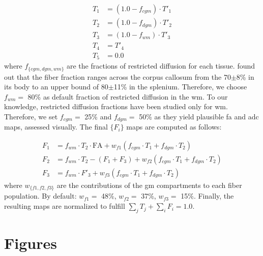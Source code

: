 \documentclass[english]{frontiers/frontiersSCNS} %
\begin{document}
  \begin{align*}
  T_1 &= (1.0-f_{cgm}) \cdot T'_1 \\
  T_2 &= (1.0-f_{dgm}) \cdot T'_2 \\
  T_3 &= (1.0-f_{wm}) \cdot T'_3 \\
  T_4 &= T'_4 \\
  T_5 &= 0.0
  \end{align*}
where $f_{\{cgm, dgm, wm\}}$ are the fractions of restricted diffusion for each tissue.
\cite{sepehrband_brain_2015} found out that the fiber fraction ranges across the corpus
  callosum from the 70$\pm$8\% in its body to an upper bound of 80$\pm$11\% in the splenium.
Therefore, we choose $f_{wm} =$ 80\% as default fraction of restricted diffusion in the
  \gls*{wm}.
To our knowledge, restricted diffusion fractions have been studied only for \gls*{wm}.
Therefore, we set $f_{cgm} =$ 25\% and $f_{dgm} =$ 50\% as they yield plausible \gls*{fa}
  and \gls*{adc} maps, assessed visually.
The final $\{F_i\}$ maps are computed as follows:

\begin{align*}
F_1 &= f_{wm} \cdot T_2 \cdot \text{FA} + w_{f1} (f_{cgm} \cdot T_1 + f_{dgm} \cdot T_2) \\
F_2 &= f_{wm} \cdot T_2 - (F_1 + F_3) + w_{f2} (f_{cgm} \cdot T_1 + f_{dgm} \cdot T_2) \\
F_3 &= f_{wm} \cdot F'_3 + w_{f3} (f_{cgm} \cdot T_1 + f_{dgm} \cdot T_2)
\end{align*}
where $w_{\{f1, f2, f3\}}$ are the contributions of the \gls*{gm} compartments to each fiber population.
By default: $w_{f1} = $ 48\%, $w_{f2} = $ 37\%, $w_{f3} = $ 15\%.
Finally, the resulting maps are normalized to fulfill $\sum_j T_j + \sum_i F_i = 1.0$.

\newpage
\section*{Figures}
\end{document}
